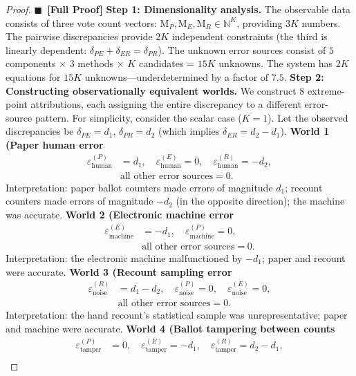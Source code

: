 \documentclass[11pt,a4paper]{article}
\theoremstyle{definition}
\newcommand{\rigorFull}[0]{$\blacksquare$~\textbf{[Full Proof]}}
\newcommand{\N}{\mathbb{N}}
\newcommand{\method}[1]{\mathrm{M}_{#1}}
\begin{document}
\begin{proof}\rigorFull
\textbf{Step 1: Dimensionality analysis.} The observable data consists of three vote count vectors: $\method{P}, \method{E}, \method{R} \in \N^K$, providing $3K$ numbers. The pairwise discrepancies provide $2K$ independent constraints (the third is linearly dependent: $\delta_{PE} + \delta_{ER} = \delta_{PR}$). The unknown error sources consist of $5$ components $\times$ $3$ methods $\times$ $K$ candidates = $15K$ unknowns. The system has $2K$ equations for $15K$ unknowns---underdetermined by a factor of $7.5$.
\textbf{Step 2: Constructing observationally equivalent worlds.} We construct 8 extreme-point attributions, each assigning the entire discrepancy to a different error-source pattern. For simplicity, consider the scalar case ($K = 1$). Let the observed discrepancies be $\delta_{PE} = d_1$, $\delta_{PR} = d_2$ (which implies $\delta_{ER} = d_2 - d_1$).
\textbf{World 1 (Paper human error}
\begin{align}
    \varepsilon^{(P)}_{\text{human}} &= d_1, \quad \varepsilon^{(E)}_{\text{human}} = 0, \quad \varepsilon^{(R)}_{\text{human}} = -d_2, \\
    &\text{all other error sources} = 0.
\end{align}
Interpretation: paper ballot counters made errors of magnitude $d_1$; recount counters made errors of magnitude $-d_2$ (in the opposite direction); the machine was accurate.
\textbf{World 2 (Electronic machine error}
\begin{align}
    \varepsilon^{(E)}_{\text{machine}} &= -d_1, \quad \varepsilon^{(P)}_{\text{machine}} = 0, \\
    &\text{all other error sources} = 0.
\end{align}
Interpretation: the electronic machine malfunctioned by $-d_1$; paper and recount were accurate.
\textbf{World 3 (Recount sampling error}
\begin{align}
    \varepsilon^{(R)}_{\text{noise}} &= d_1 - d_2, \quad \varepsilon^{(P)}_{\text{noise}} = 0, \quad \varepsilon^{(E)}_{\text{noise}} = 0, \\
    &\text{all other error sources} = 0.
\end{align}
Interpretation: the hand recount's statistical sample was unrepresentative; paper and machine were accurate.
\textbf{World 4 (Ballot tampering between counts}
\begin{align}
    \varepsilon^{(P)}_{\text{tamper}} &= 0, \quad \varepsilon^{(E)}_{\text{tamper}} = -d_1, \quad \varepsilon^{(R)}_{\text{tamper}} = d_2 - d_1, \\

\end{align}
\end{proof}
\end{document}
